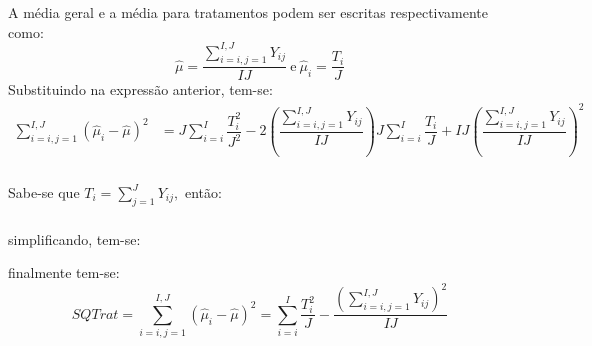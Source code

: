 \documentclass[14pt,aspectratio=1610]{beamer}
\begin{document}
\begin{frame}{}
\frametitle{}
\begin{block}{}
\justifying
A média geral e a média para tratamentos podem ser escritas respectivamente como:
$$\hat{\mu}=\dfrac{{\displaystyle \sum_{i=i,j=1}^{I,J}Y_{ij}}}{IJ}\ \textrm{e}\ 
\hat{\mu}_{i}=\dfrac{T_{i}}{J}$$
Substituindo na expressão anterior, tem-se:
\begin{align*}
{\displaystyle \sum_{i=i,j=1}^{I,J}(\hat{\mu}_{i}-\hat{\mu})^{2}}&={\displaystyle J\sum_{i=i}^{I}\dfrac{T_{i}^{2}}{J^{2}}-2\left(\dfrac{{\displaystyle \sum_{i=i,j=1}^{I,J}Y_{ij}}}{IJ}\right)J\sum_{i=i}^{I}\dfrac{T_{i}}{J}+IJ\left(\dfrac{{\displaystyle \sum_{i=i,j=1}^{I,J}Y_{ij}}}{IJ}\right)^{2}}
\end{align*}
\end{block}
\end{frame}

\begin{frame}{}
\frametitle{}
\begin{block}{}
\justifying
Sabe-se que $T_{i}={\displaystyle \sum_{j=1}^{J}Y_{ij}},$ então:

\begin{center}
\end{center}
\end{block}
\end{frame}

\begin{frame}{}
\frametitle{}
\begin{block}{}
\justifying
simplificando, tem-se:
\begin{center}
\end{center}
finalmente tem-se:
$$
SQTrat={\displaystyle \sum_{i=i,j=1}^{I,J}(\hat{\mu}_{i}-\hat{\mu})^{2}}=
{\displaystyle \sum_{i=i}^{I}\dfrac{T_{i}^{2}}{J}-\dfrac{\left({\displaystyle \sum_{i=i,j=1}^{I,J}Y_{ij}}\right)^{2}}{IJ}}
$$
\end{block}
\end{frame}
\end{document}
